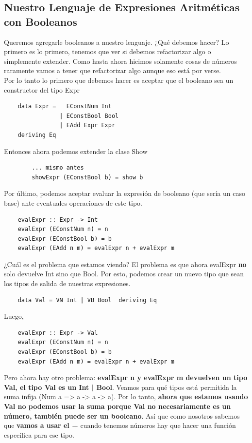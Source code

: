 \documentclass[10pt,a4paper]{article}
\begin{document}
\subsection*{Nuestro Lenguaje de Expresiones Aritméticas con Booleanos}
Queremos agregarle booleanos a nuestro lenguaje. ¿Qué debemos hacer? Lo primero es lo primero, tenemos que ver si debemos refactorizar algo o simplemente extender. Como hasta ahora hicimos solamente cosas de números raramente vamos a tener que refactorizar algo aunque eso está por verse. \\
Por lo tanto lo primero que debemos hacer es aceptar que el booleano sea un constructor del tipo Expr
\begin{lstlisting}
    data Expr =   EConstNum Int 
                | EConstBool Bool 
                | EAdd Expr Expr 
    deriving Eq
\end{lstlisting}
Entonces ahora podemos extender la clase Show 
\begin{lstlisting}
        ... mismo antes
        showExpr (EConstBool b) = show b
\end{lstlisting}
Por último, podemos aceptar evaluar la expresión de booleano (que sería un caso base) ante eventuales operaciones de este tipo. \\
\begin{lstlisting}
    evalExpr :: Expr -> Int
    evalExpr (EConstNum n) = n
    evalExpr (EConstBool b) = b
    evalExpr (EAdd n m) = evalExpr n + evalExpr m
\end{lstlisting}
¿Cuál es el problema que estamos viendo? El problema es que ahora evalExpr \textbf{no} solo devuelve Int sino que Bool. Por esto, podemos crear un nuevo tipo que sean los tipos de salida de nuestras expresiones. \\
\begin{lstlisting}
    data Val = VN Int | VB Bool  deriving Eq
\end{lstlisting}
Luego, 
\begin{lstlisting}
    evalExpr :: Expr -> Val
    evalExpr (EConstNum n) = n
    evalExpr (EConstBool b) = b
    evalExpr (EAdd n m) = evalExpr n + evalExpr m
\end{lstlisting}
Pero ahora hay otro problema: \textbf{evalExpr n y evalExpr m devuelven un tipo Val, el tipo Val es un Int | Bool}. Veamos para qué tipos está permitida la suma infija (Num a => a -> a -> a). Por lo tanto, \textbf{ahora que estamos usando Val no podemos usar la suma porque Val no necesariamente es un número, también puede ser un booleano}. Así que como nosotros sabemos que \textbf{vamos a usar el +} cuando tenemos números hay que hacer una función específica para ese tipo. \\
\end{document}
